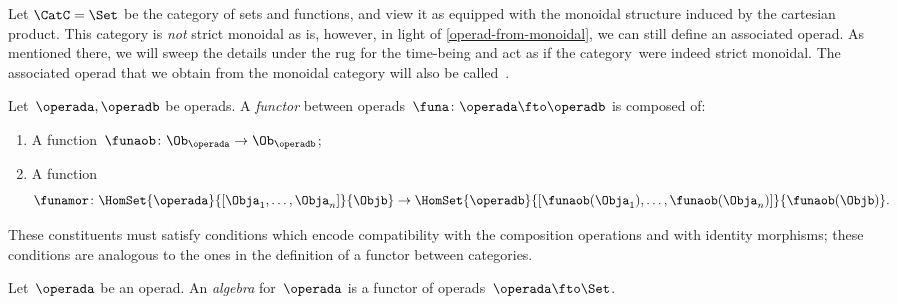 \begin{example}
    Let $\CatC = \Set$ be the category of sets and functions, and view it as equipped with the monoidal structure induced by the cartesian product.
    This category is \emph{not} strict monoidal as is, however, in light of \cref{operad-from-monoidal}, we can still define an associated operad.
    As mentioned there, we will sweep the details under the rug for the time-being and act as if the category~\Set were indeed strict monoidal.
    The associated operad that we obtain from the monoidal category \Set will also be called~\Set.
\end{example}

\begin{ctdefinition}
    \label{def:functors_operads}
    Let~$\operada,\operadb$ be operads.
    A \emph{functor} between operads~$\funa\colon \operada \fto \operadb$  is composed of:
    \begin{enumerate}
        \item A function~$\funaob\colon \Ob_\operada\to \Ob_\operadb$;
        \item A function
              \begin{equation}
                  \funamor\colon \HomSet{\operada}{[\Obja_1,\ldots,\Obja_n]}{\Objb}\to \HomSet{\operadb}{[\funaob(\Obja_1),\ldots, \funaob(\Obja_n)]}{\funaob(\Objb)}.
              \end{equation}
    \end{enumerate}
    These constituents must satisfy conditions which encode compatibility with the composition operations and with identity morphisms; these conditions are analogous to the ones in the definition of a functor between categories.
\end{ctdefinition}


\begin{definition}
    \label{def:algebra_operad}
    Let~$\operada$ be an operad.
    An \emph{algebra} for~$\operada$ is a functor of operads~$\operada \fto \Set$.
\end{definition}


